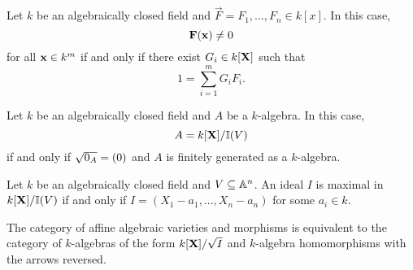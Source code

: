 \documentclass{ximera}
\begin{document}
\begin{corollary}
  Let $k$ be an algebraically closed field and $\vec{F} =
  F_1,\dots,F_n\in k[x]$. In this case,
  \[
  \mathbf{F}(\mathbf{x}) \ne 0
  \]
  for all $\mathbf{x}\in k^m$ if and only if there exist $G_i\in k[\mathbf X]$ such that
  \[
  1 = \sum_{i=1}^m G_i F_i.
  \]
\end{corollary}

\begin{corollary}
  Let $k$ be an algebraically closed field and $A$ be a $k$-algebra.
  In this case,
  \[
  A = k[\mathbf X]/\mathbb I(V) 
  \]
  if and only if $\sqrt{0_A} = (0)$ and $A$ is finitely generated as a
  $k$-algebra.
\end{corollary}


\begin{corollary}
  Let $k$ be an algebraically closed field and $V\subseteq\mathbb A^n$. An ideal $I$ is maximal in
  $k[\mathbf X]/\mathbb I(V)$ if and only if $I= (X_1-a_1,\dots,X_n-a_n)$ for some $a_i\in
  k$.
\end{corollary}

\begin{corollary}
  The category of affine algebraic varieties and morphisms is
  equivalent to the category of $k$-algebras of the form
  $k[\mathbf X]/\sqrt{I}$ and $k$-algebra homomorphisms with the arrows
  reversed.
\end{corollary}
\end{document}
